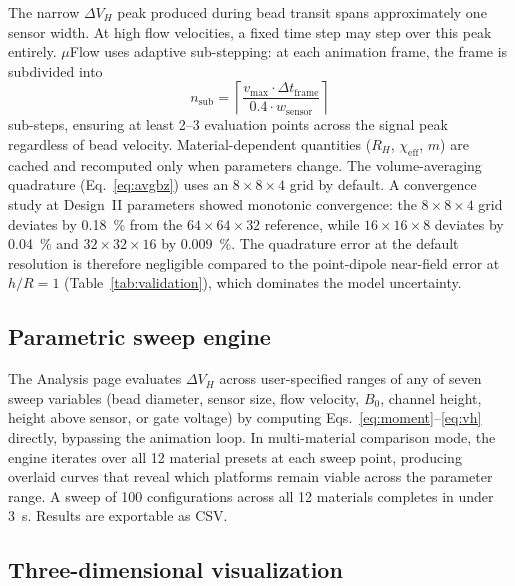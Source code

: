 \documentclass[preprint,review,12pt]{elsarticle}
\begin{document}
The narrow $\Delta V_H$ peak produced during bead transit spans approximately one sensor width. At high flow velocities, a fixed time step may step over this peak entirely. $\mu$Flow uses adaptive sub-stepping: at each animation frame, the frame is subdivided into
\begin{equation}
n_{\text{sub}} = \left\lceil \frac{v_{\max} \cdot \Delta t_{\text{frame}}}{0.4 \cdot w_{\text{sensor}}} \right\rceil
\label{eq:substep}
\end{equation}
sub-steps, ensuring at least 2--3 evaluation points across the signal peak regardless of bead velocity. Material-dependent quantities ($R_H$, $\chi_{\text{eff}}$, $m$) are cached and recomputed only when parameters change. The volume-averaging quadrature (Eq.~\eqref{eq:avgbz}) uses an $8 \times 8 \times 4$ grid by default. A convergence study at Design~II parameters showed monotonic convergence: the $8 \times 8 \times 4$ grid deviates by \SI{0.18}{\percent} from the $64 \times 64 \times 32$ reference, while $16 \times 16 \times 8$ deviates by \SI{0.04}{\percent} and $32 \times 32 \times 16$ by \SI{0.009}{\percent}. The quadrature error at the default resolution is therefore negligible compared to the point-dipole near-field error at $h/R = 1$ (Table~\ref{tab:validation}), which dominates the model uncertainty.

\subsection{Parametric sweep engine}
\label{sec:sweep}

The Analysis page evaluates $\Delta V_H$ across user-specified ranges of any of seven sweep variables (bead diameter, sensor size, flow velocity, $B_0$, channel height, height above sensor, or gate voltage) by computing Eqs.~\eqref{eq:moment}--\eqref{eq:vh} directly, bypassing the animation loop. In multi-material comparison mode, the engine iterates over all 12 material presets at each sweep point, producing overlaid curves that reveal which platforms remain viable across the parameter range. A sweep of 100 configurations across all 12 materials completes in under \SI{3}{\second}. Results are exportable as CSV.

\subsection{Three-dimensional visualization}
\label{sec:3dviz}
\end{document}
